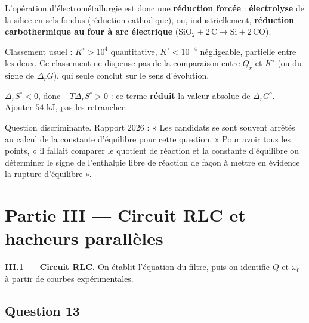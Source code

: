 \documentclass[11pt,a4paper]{article}
\begin{document}
L'opération d'électrométallurgie est donc une \textbf{réduction forcée} : \textbf{électrolyse} de la silice en sels fondus (réduction cathodique), ou, industriellement, \textbf{réduction carbothermique au four à arc électrique} (\(\mathrm{SiO_2} + \mathrm{2\,C} \to \mathrm{Si} + \mathrm{2\,CO}\)).

\begin{methode}

Classement usuel : \(K^\circ>10^4\) quantitative, \(K^\circ<10^{-4}\) négligeable, partielle entre les deux. Ce classement ne dispense pas de la comparaison entre \(Q_r\) et \(K^\circ\) (ou du signe de \(\Delta_rG\)), qui seule conclut sur le sens d'évolution.

\end{methode}

\begin{piege}

\(\Delta_rS^\circ<0\), donc \(-T\Delta_rS^\circ>0\) : ce terme \textbf{réduit} la valeur absolue de \(\Delta_rG^\circ\). Ajouter \(54\) kJ, pas les retrancher.

\end{piege}

\begin{jury}

Question discriminante. Rapport 2026 : « Les candidats se sont souvent arrêtés au calcul de la constante d'équilibre pour cette question. » Pour avoir tous les points, « il fallait comparer le quotient de réaction et la constante d'équilibre ou déterminer le signe de l'enthalpie libre de réaction de façon à mettre en évidence la rupture d'équilibre ».

\end{jury}

\hypertarget{partie-iii-circuit-rlc-et-hacheurs-paralluxe8les}{%
\section{Partie III --- Circuit RLC et hacheurs parallèles}\label{partie-iii-circuit-rlc-et-hacheurs-paralluxe8les}}

\textbf{III.1 --- Circuit RLC.} On établit l'équation du filtre, puis on identifie \(Q\) et \(\omega_0\) à partir de courbes expérimentales.

\hypertarget{question-13}{%
\subsection{Question 13}\label{question-13}}
\end{document}
